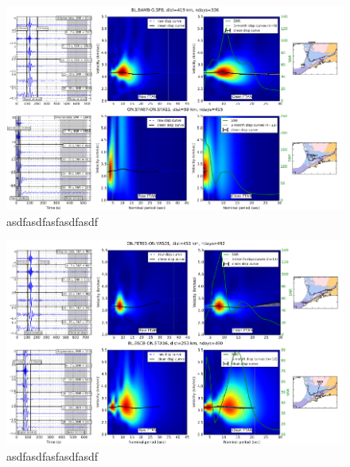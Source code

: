 \begin{figure}[!ht]
\centering
\includegraphics[scale=0.3]{Figs/dist_FTAN.png}
\caption{asdfasdfasfasdfasdf}
\label{dist_FTAN}
\end{figure}

\begin{figure}[!ht]
\centering
\includegraphics[scale=0.3]{Figs/fonte_FTAN.png}
\caption{asdfasdfasfasdfasdf}
\label{fonte_FTAN}
\end{figure}


\pagebreak
